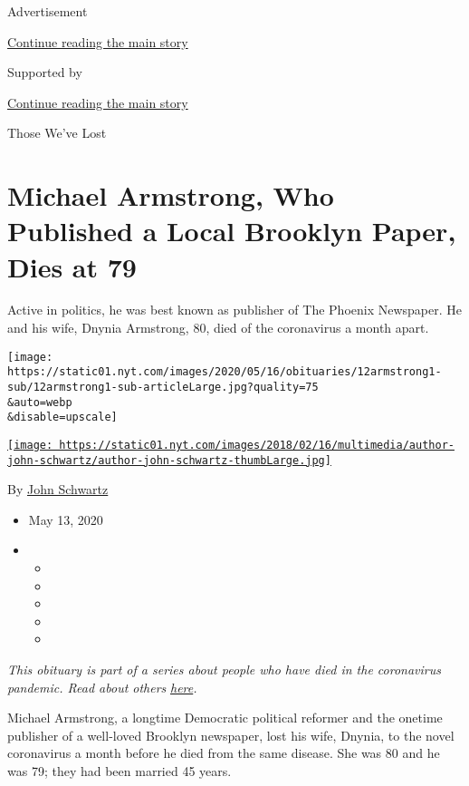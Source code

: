 Advertisement

\protect\hyperlink{after-top}{Continue reading the main story}

Supported by

\protect\hyperlink{after-sponsor}{Continue reading the main story}

Those We've Lost

\hypertarget{michael-armstrong-who-published-a-local-brooklyn-paper-dies-at-79}{%
\section{Michael Armstrong, Who Published a Local Brooklyn Paper, Dies
at
79}\label{michael-armstrong-who-published-a-local-brooklyn-paper-dies-at-79}}

Active in politics, he was best known as publisher of The Phoenix
Newspaper. He and his wife, Dnynia Armstrong, 80, died of the
coronavirus a month apart.

\texttt{[image: https://static01.nyt.com/images/2020/05/16/obituaries/12armstrong1-sub/12armstrong1-sub-articleLarge.jpg?quality=75\\\&auto=webp\\\&disable=upscale]}

\href{https://www.nytimes.com/by/john-schwartz}{\texttt{[image: https://static01.nyt.com/images/2018/02/16/multimedia/author-john-schwartz/author-john-schwartz-thumbLarge.jpg]}}

By \href{https://www.nytimes.com/by/john-schwartz}{John Schwartz}

\begin{itemize}
\item
  May 13, 2020
\item
  \begin{itemize}
  \item
  \item
  \item
  \item
  \item
  \end{itemize}
\end{itemize}

\emph{This obituary is part of a series about people who have died in
the coronavirus pandemic. Read about others}
\href{https://www.nytimes.com/series/people-who-have-died-of-the-coronavirus}{\emph{here}}\emph{.}

Michael Armstrong, a longtime Democratic political reformer and the
onetime publisher of a well-loved Brooklyn newspaper, lost his wife,
Dnynia, to the novel coronavirus a month before he died from the same
disease. She was 80 and he was 79; they had been married 45 years.

